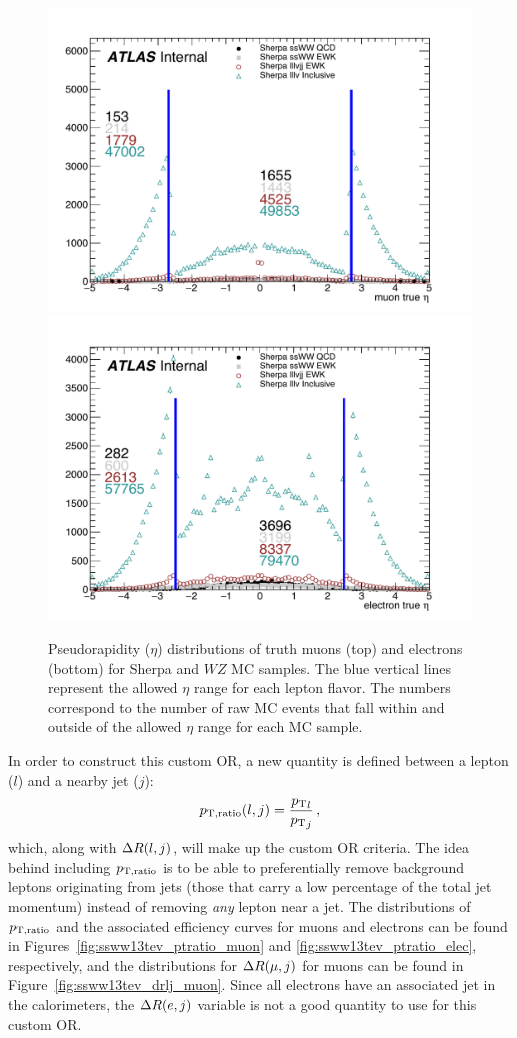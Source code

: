 \begin{figure}[htbp]
  \centering
  \includegraphics[width=.48\textwidth]{figs/ssww_13tev/custom_or/ExtraMuonEta_counted}
  \includegraphics[width=.48\textwidth]{figs/ssww_13tev/custom_or/ExtraElecEta_counted}
  \caption{Pseudorapidity ($\eta$) distributions of truth muons (top) and electrons (bottom) for Sherpa \ssww and $WZ$ MC samples.  The blue vertical lines represent the allowed $\eta$ range for each lepton flavor.  The numbers correspond to the number of raw MC events that fall within and outside of the allowed $\eta$ range for each MC sample.}
  \label{fig:ssww13tev_wzveto_truthlepeta}
\end{figure}

In order to construct this custom OR, a new quantity is defined between a lepton ($l$) and a nearby jet ($j$):
\begin{equation}
  \ptratio(l,j) = \frac{{\pt}_l}{{\pt}_j}\,, %
  \label{eq:ssww13tev_ptratio}
\end{equation}
which, along with $\Delta R(l,j)$, will make up the custom OR criteria.
The idea behind including $p_{\textrm{T},\textrm{ratio}}$ is to be able to preferentially remove background leptons originating from jets (those that carry a low percentage of the total jet momentum) instead of removing \emph{any} lepton near a jet.
The distributions of $p_{\textrm{T},\textrm{ratio}}$ and the associated efficiency curves for muons and electrons can be found in Figures~\ref{fig:ssww13tev_ptratio_muon} and \ref{fig:ssww13tev_ptratio_elec}, respectively, and the distributions for $\Delta R(\mu,j)$ for muons can be found in Figure~\ref{fig:ssww13tev_drlj_muon}.
Since all electrons have an associated jet in the calorimeters, the $\Delta R(e,j)$ variable is not a good quantity to use for this custom OR.

